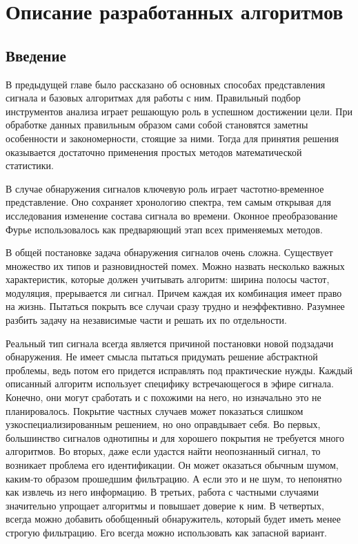 \section{Описание разработанных алгоритмов}
\label{sec:practice}


\subsection{Введение}

В предыдущей главе было рассказано об основных способах представления сигнала и базовых алгоритмах для работы с ним. Правильный подбор инструментов анализа играет решающую роль в успешном достижении цели. При обработке данных правильным образом сами собой становятся заметны особенности и закономерности, стоящие за ними. Тогда для принятия решения оказывается достаточно применения простых методов математической статистики.

В случае обнаружения сигналов ключевую роль играет частотно-временное представление. Оно сохраняет хронологию спектра, тем самым открывая для исследования изменение состава сигнала во времени. Оконное преобразование Фурье использовалось как предваряющий этап всех применяемых методов.

В общей постановке задача обнаружения сигналов очень сложна. Существует множество их типов и разновидностей помех. Можно назвать несколько важных характеристик, которые должен учитывать алгоритм: ширина полосы частот, модуляция, прерывается ли сигнал. Причем каждая их комбинация имеет право на жизнь. Пытаться покрыть все случаи сразу трудно и неэффективно. Разумнее разбить задачу на независимые части и решать их по отдельности.

Реальный тип сигнала всегда является причиной постановки новой подзадачи обнаружения. Не имеет смысла пытаться придумать решение абстрактной проблемы, ведь потом его придется исправлять под практические нужды. Каждый описанный алгоритм использует специфику встречающегося в эфире сигнала. Конечно, они могут сработать и с похожими на него, но изначально это не планировалось. Покрытие частных случаев может показаться слишком узкоспециализированным решением, но оно оправдывает себя. Во первых, большинство сигналов однотипны и для хорошего покрытия не требуется много алгоритмов. Во вторых, даже если удастся найти неопознанный сигнал, то возникает проблема его идентификации. Он может оказаться обычным шумом, каким-то образом прошедшим фильтрацию. А если это и не шум, то непонятно как извлечь из него информацию. В третьих, работа с частными случаями значительно упрощает алгоритмы и повышает доверие к ним. В четвертых, всегда можно добавить обобщенный обнаружитель, который будет иметь менее строгую фильтрацию. Его всегда можно использовать как запасной вариант.


